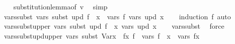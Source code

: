 \begin{isabellebody}
%
\isadelimproof
\ \ %
\endisadelimproof
%
\isatagproof
{}\isamarkupfalse%
\ substitution{\isacharunderscore}{\kern0pt}lemma{\isacharbrackleft}{\kern0pt}of\ v{\isacharbrackright}{\kern0pt}\ \isamarkupfalse%
\ simp%
\endisatagproof
{\isafoldproof}%
%
\isadelimproof
\isanewline
%
\endisadelimproof
\isanewline
{}\isamarkupfalse%
\ vars{\isacharunderscore}{\kern0pt}subst{\isacharcolon}{\kern0pt}\ {\isachardoublequoteopen}vars\ {\isacharparenleft}{\kern0pt}subst\ upd\ f{\isacharparenright}{\kern0pt}\ {\isacharequal}{\kern0pt}\ {\isacharparenleft}{\kern0pt}{\isasymUnion}x\ {\isasymin}\ vars\ f{\isachardot}{\kern0pt}\ vars\ {\isacharparenleft}{\kern0pt}upd\ x{\isacharparenright}{\kern0pt}{\isacharparenright}{\kern0pt}{\isachardoublequoteclose}\isanewline
%
\isadelimproof
\ \ %
\endisadelimproof
%
\isatagproof
{}\isamarkupfalse%
\ {\isacharparenleft}{\kern0pt}induction\ f{\isacharparenright}{\kern0pt}\ auto%
\endisatagproof
{\isafoldproof}%
%
\isadelimproof
\isanewline
%
\endisadelimproof
\isanewline
{}\isamarkupfalse%
\ vars{\isacharunderscore}{\kern0pt}subst{\isacharunderscore}{\kern0pt}upper{\isacharcolon}{\kern0pt}\ {\isachardoublequoteopen}vars\ {\isacharparenleft}{\kern0pt}subst\ upd\ f{\isacharparenright}{\kern0pt}\ {\isasymsubseteq}\ {\isacharparenleft}{\kern0pt}{\isasymUnion}x{\isachardot}{\kern0pt}\ vars\ {\isacharparenleft}{\kern0pt}upd\ x{\isacharparenright}{\kern0pt}{\isacharparenright}{\kern0pt}{\isachardoublequoteclose}\isanewline
%
\isadelimproof
\ \ %
\endisadelimproof
%
\isatagproof
{}\isamarkupfalse%
\ vars{\isacharunderscore}{\kern0pt}subst\ \isamarkupfalse%
\ force%
\endisatagproof
{\isafoldproof}%
%
\isadelimproof
\isanewline
%
\endisadelimproof
\isanewline
{}\isamarkupfalse%
\ vars{\isacharunderscore}{\kern0pt}subst{\isacharunderscore}{\kern0pt}upd{\isacharunderscore}{\kern0pt}upper{\isacharcolon}{\kern0pt}\ {\isachardoublequoteopen}vars\ {\isacharparenleft}{\kern0pt}subst\ {\isacharparenleft}{\kern0pt}Var{\isacharparenleft}{\kern0pt}x\ {\isacharcolon}{\kern0pt}{\isacharequal}{\kern0pt}\ fx{\isacharparenright}{\kern0pt}{\isacharparenright}{\kern0pt}\ f{\isacharparenright}{\kern0pt}\ {\isasymsubseteq}\ vars\ f\ {\isacharminus}{\kern0pt}\ {\isacharbraceleft}{\kern0pt}x{\isacharbraceright}{\kern0pt}\ {\isasymunion}\ vars\ fx{\isachardoublequoteclose}\isanewline
%
\isadelimproof
%
\endisadelimproof
%
\isatagproof
{}\isamarkupfalse%
\isanewline
\ \ \isamarkupfalse%

\end{isabellebody}
